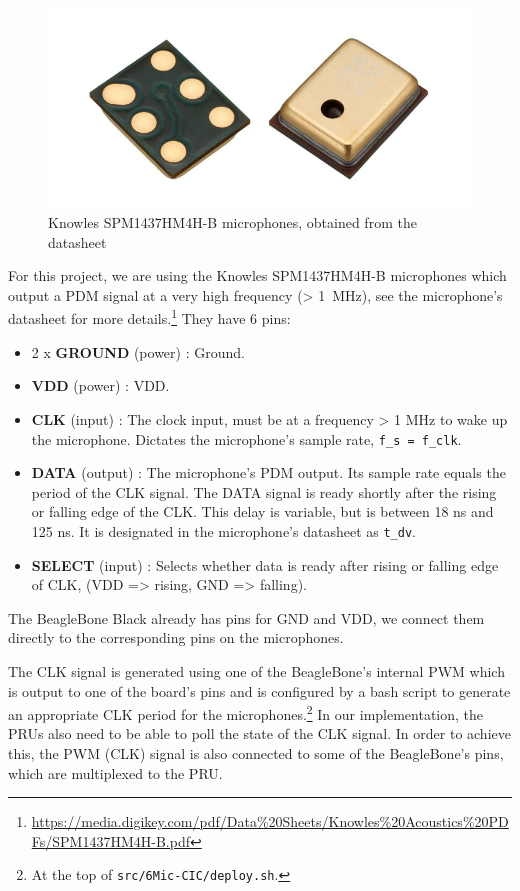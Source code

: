 \documentclass[]{report}
\providecommand{\tightlist}{%
	\setlength{\itemsep}{0pt}\setlength{\parskip}{0pt}}
\begin{document}
\begin{figure}[H]
\centering
\includegraphics[width=0.6\linewidth]{Pictures/mics.png}
\caption{Knowles SPM1437HM4H-B microphones, obtained from the datasheet}
\end{figure}

For this project, we are using the Knowles SPM1437HM4H-B microphones
which output a PDM signal at a very high frequency (\textgreater{} 1~MHz), see the microphone's datasheet for more
details.\footnote{\url{https://media.digikey.com/pdf/Data\%20Sheets/Knowles\%20Acoustics\%20PDFs/SPM1437HM4H-B.pdf}} They have 6 pins:

\begin{itemize}
\tightlist
\item
  2 x \textbf{GROUND} (power) : Ground.
\item
  \textbf{VDD} (power) : VDD.
\item
  \textbf{CLK} (input) : The clock input, must be at a frequency
  \textgreater{} 1 MHz to wake up the microphone. Dictates the
  microphone's sample rate, \texttt{f\_s\ =\ f\_clk}.
\item
  \textbf{DATA} (output) : The microphone's PDM output. Its sample rate
  equals the period of the CLK signal. The DATA signal is ready shortly
  after the rising or falling edge of the CLK. This delay is variable,
  but is between 18 ns and 125 ns. It is designated in the microphone's datasheet
  as \texttt{t\_dv}.
\item
  \textbf{SELECT} (input) : Selects whether data is ready after rising
  or falling edge of CLK, (VDD =\textgreater{} rising, GND
  =\textgreater{} falling).
\end{itemize}

The BeagleBone Black already has pins for GND and VDD, we connect them directly to the corresponding pins on the microphones.

The CLK signal is generated using one of the BeagleBone's internal PWM which is output to one of the board's pins and is configured by a bash script to generate an appropriate CLK period for the microphones.\footnote{At the top of \texttt{src/6Mic-CIC/deploy.sh}.} In our implementation, the PRUs also need to be able to poll the state of the CLK signal. In order to achieve this, the PWM (CLK) signal is also connected to some of the BeagleBone's pins, which are multiplexed to the PRU.
\end{document}
